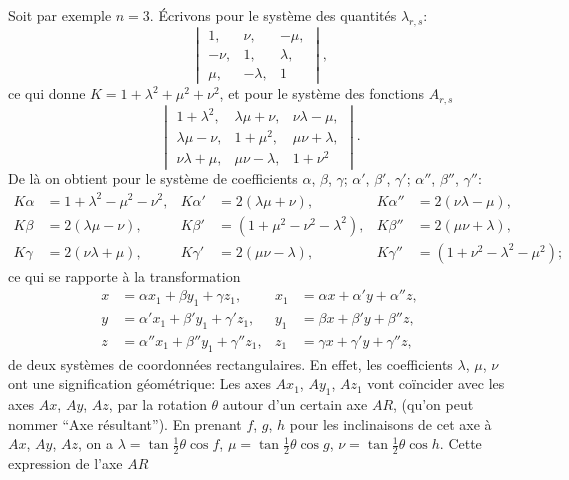\documentclass[11pt]{article}
\begin{document}
Soit par exemple $n = 3$. \'Ecrivons pour le syst\`eme des quantit\'es $\lambda_{r,s}$:
\[
\begin{vmatrix} 1, & \nu, & -\mu, \\ -\nu, & 1, & \lambda, \\ \mu, & -\lambda, & 1 \end{vmatrix} \tag{17},
\]
ce qui donne $K = 1 + \lambda^{2} + \mu^{2} + \nu^{2}$, et pour le syst\`eme des fonctions $A_{r,s}$
\[
\begin{vmatrix} 1 + \lambda^{2}, & \lambda\mu + \nu, & \nu\lambda - \mu, \\ \lambda\mu - \nu, & 1 + \mu^{2}, & \mu\nu + \lambda, \\ \nu\lambda + \mu, & \mu\nu - \lambda, & 1 + \nu^{2} \end{vmatrix} \tag{18}.
\]
De l\`a on obtient pour le syst\`eme de coefficients $\alpha$, $\beta$, $\gamma$; $\alpha'$, $\beta'$, $\gamma'$; $\alpha''$, $\beta''$, $\gamma''$:
\[
\begin{aligned}
K\alpha &= 1 + \lambda^{2} - \mu^{2} - \nu^{2}, & K\alpha' &= 2(\lambda\mu + \nu), & K\alpha'' &= 2(\nu\lambda - \mu),\\
K\beta &= 2(\lambda\mu - \nu), & K\beta' &= (1 + \mu^{2} - \nu^{2} - \lambda^{2}), & K\beta'' &= 2(\mu\nu + \lambda),\\
K\gamma &= 2(\nu\lambda + \mu), & K\gamma' &= 2(\mu\nu - \lambda), & K\gamma'' &= (1 + \nu^{2} - \lambda^{2} - \mu^{2});
\end{aligned}
\tag{19}
\]
ce qui se rapporte \`a la transformation
\[
\begin{aligned}
x &= \alpha x_{1} + \beta y_{1} + \gamma z_{1}, & x_{1} &= \alpha x + \alpha' y + \alpha'' z,\\
y &= \alpha' x_{1} + \beta' y_{1} + \gamma' z_{1}, & y_{1} &= \beta x + \beta' y + \beta'' z,\\
z &= \alpha'' x_{1} + \beta'' y_{1} + \gamma'' z_{1}, & z_{1} &= \gamma x + \gamma' y + \gamma'' z,
\end{aligned}
\tag{20}
\]
de deux syst\`emes de coordonn\'ees rectangulaires. En effet, les coefficients $\lambda$, $\mu$, $\nu$ ont
une signification g\'eom\'etrique: Les axes $A x_{1}$, $A y_{1}$, $A z_{1}$ vont co\"incider avec les axes
$A x$, $A y$, $A z$, par la rotation $\theta$ autour d'un certain axe $A R$, (qu'on peut nommer
``Axe r\'esultant''). En prenant $f$, $g$, $h$ pour les inclinaisons de cet axe \`a $A x$, $A y$, $A z$,
on a $\lambda = \tan\tfrac{1}{2}\theta\cos f$, $\mu = \tan\tfrac{1}{2}\theta\cos g$, $\nu = \tan\tfrac{1}{2}\theta\cos h$. Cette expression de l'axe $AR$
\end{document}
